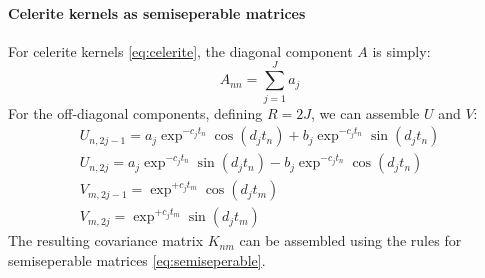 \paragraph{Celerite kernels as semiseperable matrices}
For celerite kernels \ref{eq:celerite}, the diagonal component $A$ is simply:
\begin{equation*}
    A_{nn} = \sum_{j=1}^J a_j
\end{equation*} \cite{foreman-mackay}
For the off-diagonal components, defining $R = 2J$, we can assemble $U$ and $V$:
\begin{equation*}
    \begin{aligned}
        U_{n, 2j-1} = a_j \exp^{-c_j t_n} \cos(d_j t_n) + b_j \exp^{-c_j t_n} \sin(d_j t_n) \\
        U_{n, 2j} = a_j \exp^{-c_j t_n} \sin(d_j t_n) - b_j \exp^{-c_j t_n} \cos(d_j t_n) \\
        V_{m, 2j-1} = \exp^{+c_j t_m} \cos(d_j t_m) \\
        V_{m, 2j} = \exp^{+c_j t_m} \sin(d_j t_m)
    \end{aligned}
\end{equation*} \cite{foreman-mackay}
The resulting covariance matrix $K_{nm}$ can be assembled using the rules for semiseperable matrices \ref{eq:semiseperable}. 

